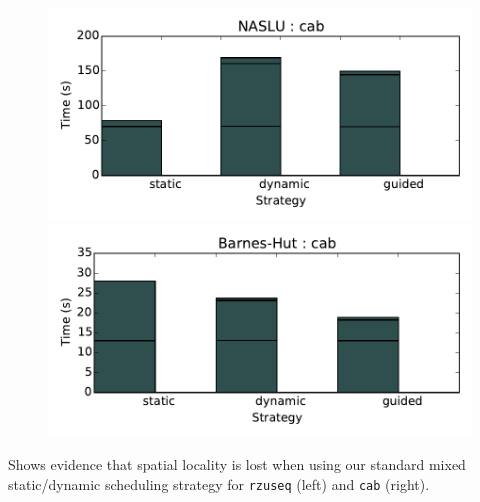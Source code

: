{\begin{frame}
\begin{figure}[ht!]
\begin{center}
\includegraphics[scale=0.26]{plots/baseline-NASLU-cab-wallTime.pdf}\includegraphics[scale=0.26]{plots/baseline-nbody-cab-wallTime.pdf}
\end{center}
\end{figure}

\begin{center}
{\small Shows evidence that spatial locality is lost when using our standard mixed static/dynamic scheduling strategy for {\tt rzuseq} (left) and \texttt{cab} (right).}
\end{center}
\end{frame}

}

